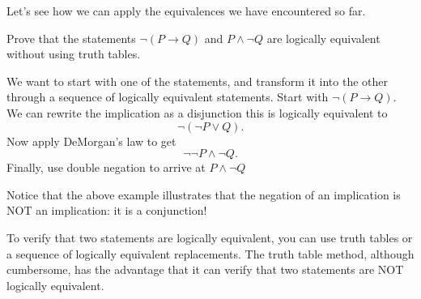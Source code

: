 \documentclass[11pt,]{book}
\theoremstyle{ptxplainnotitle}
\theoremstyle{ptxplaintitle}
\theoremstyle{ptxdefinitionnotitle}
\theoremstyle{ptxdefinitiontitle}
\theoremstyle{ptxdefinitionnotitle}
\theoremstyle{ptxdefinitiontitle}
\theoremstyle{ptxdefinitionnotitle}
\theoremstyle{ptxdefinitiontitle}
\theoremstyle{ptxdefinitiontitlenonumber}
\theoremstyle{ptxdefinitiontitlenonumber}
\numberwithin{equation}{chapter}
\newcommand{\imp}{\rightarrow}
\begin{document}
\hypertarget{p-2185}{}%
Let's see how we can apply the equivalences we have encountered so far.%
\begin{example}\label{example-59}
\hypertarget{p-2186}{}%
Prove that the statements \(\neg(P \imp Q)\) and \(P\wedge \neg Q\) are logically equivalent without using truth tables.%
\par\smallskip%
\noindent\textbf{}\hypertarget{solution-239}{}\hypertarget{p-2187}{}%
We want to start with one of the statements, and transform it into the other through a sequence of logically equivalent statements. Start with \(\neg(P \imp Q)\). We can rewrite the implication as a disjunction this is logically equivalent to%
\begin{equation*}
\neg(\neg P \vee Q).
\end{equation*}
Now apply DeMorgan's law to get%
\begin{equation*}
\neg\neg P \wedge \neg Q.
\end{equation*}
Finally, use double negation to arrive at \(P \wedge \neg Q\)%
\end{example}
\hypertarget{p-2188}{}%
Notice that the above example illustrates that the negation of an implication is NOT an implication: it is a conjunction!%
\par
\hypertarget{p-2189}{}%
To verify that two statements are logically equivalent, you can use truth tables or a sequence of logically equivalent replacements. The truth table method, although cumbersome, has the advantage that it can verify that two statements are NOT logically equivalent.%
\end{document}
